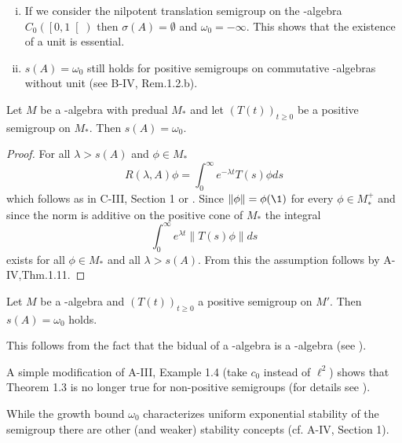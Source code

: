 \newpage
\begin{remark}\label{rem:d4-1.2}
\begin{enumerate}[(i), wide]
\item
If we consider the nilpotent translation semigroup on the \CA-algebra $C_{0}( \left[0,1\right[ )$ then $\sigma(A) = \emptyset$ and $\omega_{0} = -\infty$.
This shows that the existence of a unit is essential.

\item
$s(A) = \omega_{0}$ still holds for positive semigroups on commutative \CA-algebras without unit (see B-IV, Rem.1.2.b).
\end{enumerate}
\end{remark}
\begin{theorem}\label{thm:d4-1.3}
Let $M$ be a \WA-algebra with predual $M_{*}$ and let $(T(t))_{t \geq 0}$ be a positive semigroup on $M_{*}$.
Then $s(A) = \omega_{0}$.
\end{theorem}
\begin{proof}
For all $\lambda > s(A)$ and $\phi \in M_{*}$
\[
R(\lambda,A)\phi = \int_{0}^{\infty} e^{-\lambda t}T(s)\phi ds
\]
which follows as in C-III, Section 1 or \citet[Theorem 3]{greinervoigtwolff:1981}.
Since $\|\phi\| = \phi(\1)$ for every $\phi \in M_{*}^{+}$ and since the norm is additive on the positive cone of $M_{*}$ the integral
\[
	\int_{0}^{\infty} e^{\lambda t}\|T(s)\phi\|ds
\]
exists for all $\phi \in M_{*}$ and all $\lambda > s(A)$.
From this the assumption follows by A-IV,Thm.1.11.
\end{proof}
\begin{corollary}\label{cor:d4-1.4}
Let $M$ be a \CA-algebra and $(T(t))_{t \geq 0}$ a positive semigroup on $M'$.
Then $s(A) = \omega_{0}$ holds.
\end{corollary}
This follows from the fact that the bidual of a \CA-algebra is a \WA-algebra (see \citet[Theorem III.2.4.]{takesaki:1979}).
\begin{remark}\label{rem:d4-1.5}
A simple modification of A-III, Example 1.4 (take $c_{0}$ instead of $\ell^2$) shows that Theorem 1.3 is no longer true for non-positive semigroups (for details see \citet[Beispiel 2.5]{grohneubrander:1981}).

While the growth bound $\omega_{0}$ characterizes uniform exponential stability of the semigroup there are other (and weaker) stability concepts (cf. A-IV, Section 1).
\end{remark}

